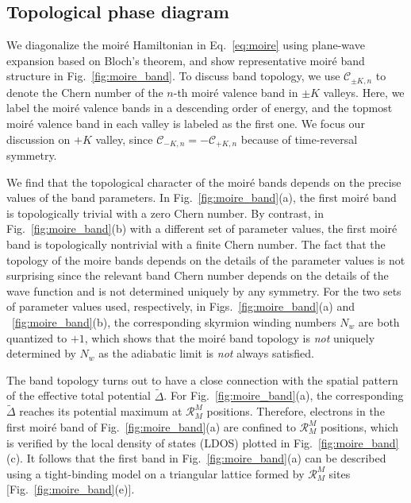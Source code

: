 \documentclass[aps,prx,floatfix,twocolumn]{revtex4-1}
\begin{document}
	
	\subsection{Topological phase diagram}
	
	We diagonalize the moir\'e Hamiltonian in Eq.~\eqref{eq:moire} using plane-wave expansion based on Bloch's theorem, and show representative moir\'e band structure in Fig.~\ref{fig:moire_band}. To discuss band topology, we use $\mathcal{C}_{\pm K, n}$ to denote the Chern number of the $n$-th moir\'e valence band in $\pm K$ valleys. Here, we label the moir\'e valence bands in a descending order of energy, and the topmost moir\'e valence band in each valley is labeled as the first one. We focus our discussion on $+K$ valley, since $\mathcal{C}_{-K, n} = -\mathcal{C}_{+K, n}$ because of time-reversal symmetry. 
	
	We find that the topological character of the moir\'e bands depends on the precise values of the band parameters. In Fig.~\ref{fig:moire_band}(a), the first moir\'e band is topologically trivial with a zero Chern number. By contrast, in Fig.~\ref{fig:moire_band}(b) with a different set of parameter values, the first moir\'e band is topologically nontrivial with a finite Chern number. The fact that the topology of the moire bands depends on the details of the parameter values is not surprising since the relevant band Chern number depends on the details of the wave function and is not determined uniquely by any symmetry. For the two sets of parameter values used, respectively, in Figs.~\ref{fig:moire_band}(a) and ~\ref{fig:moire_band}(b), the corresponding skyrmion winding numbers $N_w$ are both quantized to $+1$, which shows that the moir\'e band topology is {\it not} uniquely determined by $N_w$ as the adiabatic limit is {\it not} always satisfied.
	
	The band topology turns out to have a close connection with the spatial pattern of the effective total potential $\tilde{\Delta}$. For Fig.~\ref{fig:moire_band}(a), the corresponding $\tilde{\Delta}$ reaches its potential maximum at $\mathcal{R}_M^M$ positions. Therefore, electrons in the first moir\'e band of Fig.~\ref{fig:moire_band}(a) are confined to $\mathcal{R}_M^M$ positions, which is verified by the local density of states (LDOS) plotted in Fig.~\ref{fig:moire_band}(c).  It follows that the first band in Fig.~\ref{fig:moire_band}(a)  can be described using a tight-binding model on a triangular lattice formed  by $\mathcal{R}_M^M$ sites [Fig.~\ref{fig:moire_band}(e)]. 
	
\end{document}
